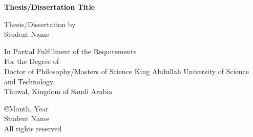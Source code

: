\documentclass[onecolumn, 12 pt, doublespace, fullpage, a4paper]{report}
\begin{document}

\thispagestyle{empty}
\addvspace{5mm}  %


\begin{center}
\begin{doublespace}
{\textbf{{\large Thesis/Dissertation Title}}}%
\end{doublespace}

\vspace{10mm}
{Thesis/Dissertation by}\\
{Student Name} %

\vspace{30mm}

{ In Partial Fulfillment of the Requirements}\\[12pt]
{ For the Degree of}\\[12pt]
{Doctor of Philosophy/Masters of Science} \vfill
{King Abdullah University of Science and Technology }\\
{Thuwal, Kingdom of Saudi Arabia}
\vfill


\begin{onehalfspace}
{\copyright Month, Year}\\
Student Name\\               %
All rights reserved\\

\end{onehalfspace}

\end{center}
\newpage


%
\chaptertitlefont{\fontsize{14}{15}\selectfont\centering}  

\end{document}
